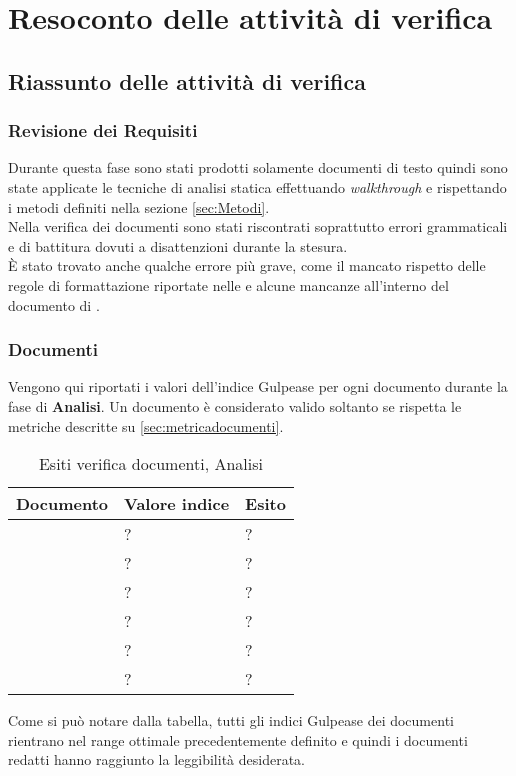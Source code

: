 \section{Resoconto delle attività di verifica}
\subsection{Riassunto delle attività di verifica}{
\subsubsection{Revisione dei Requisiti}{

Durante questa fase sono stati prodotti solamente documenti di testo quindi sono state applicate le tecniche di analisi statica effettuando \textit{walkthrough} e rispettando i metodi definiti nella sezione \ref{sec:Metodi}.\\
Nella verifica dei documenti sono stati riscontrati soprattutto errori grammaticali e di battitura dovuti a disattenzioni durante la stesura.\\
È stato trovato anche qualche errore più grave, come il mancato rispetto delle regole di formattazione riportate nelle \NormeDiProgetto e alcune mancanze all'interno del documento di \AnalisiDeiRequisiti.\\
}
\subsubsection{Documenti}{
Vengono qui riportati i valori dell’indice Gulpease per ogni documento durante la fase di \textbf{Analisi}. Un documento è considerato valido soltanto se rispetta le metriche descritte su \ref{sec:metricadocumenti}.

\begin{table}[H]
	\centering
	\begin{tabular}{p{}p{}
			p{}}
		\toprule Documento & Valore indice & Esito \\
		\midrule
		\PianoDiProgetto & ? & ? \\
		\AnalisiDeiRequisiti & ? & ? \\
		\NormeDiProgetto & ? & ? \\
		\PianoDiQualifica & ? & ? \\
		\StudioDiFattibilita & ? & ? \\
		\Glossario & ? & ? \\
		\bottomrule
	\end{tabular}
	\label{tab:costorequisiti}
	\caption{Esiti verifica documenti, Analisi}
\end{table}

Come si può notare dalla tabella, tutti gli indici Gulpease dei documenti rientrano nel range ottimale precedentemente definito e quindi i documenti redatti hanno raggiunto la leggibilità desiderata.
}
}